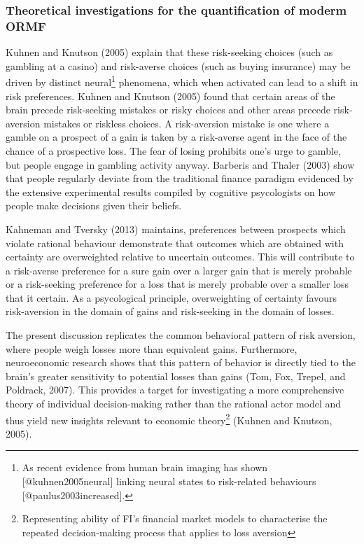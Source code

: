 \documentclass[]{DissertateUSU}
\let\rmarkdownfootnote\footnote%
\def\footnote{\protect\rmarkdownfootnote}
\begin{document}
\subsubsection{Theoretical investigations for the quantification of moderm ORMF}

Kuhnen and Knutson (2005) explain that these risk-seeking choices (such
as gambling at a casino) and risk-averse choices (such as buying
insurance) may be driven by distinct
neural\footnote{As recent evidence from human brain imaging has shown [@kuhnen2005neural] linking neural states to risk-related behaviours [@paulus2003increased].}
phenomena, which when activated can lead to a shift in risk preferences.
Kuhnen and Knutson (2005) found that certain areas of the brain precede
risk-seeking mistakes or risky choices and other areas precede
risk-aversion mistakes or riskless choices. A risk-aversion mistake is
one where a gamble on a prospect of a gain is taken by a risk-averse
agent in the face of the chance of a prospective loss. The fear of
losing prohibits one's urge to gamble, but people engage in gambling
activity anyway. Barberis and Thaler (2003) show that people regularly
deviate from the traditional finance paradigm evidenced by the extensive
experimental results compiled by cognitive psycologists on how people
make decisions given their beliefs.\medskip 

Kahneman and Tversky (2013) maintains, preferences between prospects
which violate rational behaviour demonstrate that outcomes which are
obtained with certainty are overweighted relative to uncertain outcomes.
This will contribute to a risk-averse preference for a sure gain over a
larger gain that is merely probable or a risk-seeking preference for a
loss that is merely probable over a smaller loss that it certain. As a
psycological principle, overweighting of certainty favours risk-aversion
in the domain of gains and risk-seeking in the domain of losses.\medskip

The present discussion replicates the common behavioral pattern of risk
aversion, where people weigh losses more than equivalent gains.
Furthermore, neuroeconomic research shows that this pattern of behavior
is directly tied to the brain's greater sensitivity to potential losses
than gains (Tom, Fox, Trepel, and Poldrack, 2007). This provides a
target for investigating a more comprehensive theory of individual
decision-making rather than the rational actor model and thus yield new
insights relevant to economic
theory\footnote{Representing ability of FI's financial market models to characterise the repeated decision-making process that applies to loss aversion}
(Kuhnen and Knutson, 2005).\medskip  
\end{document}

